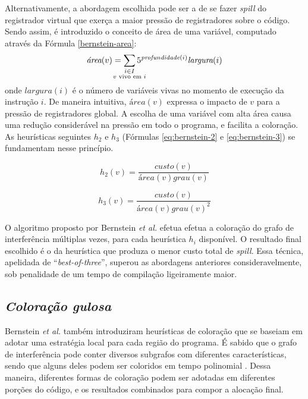 \documentclass[
	12pt,				%
	openright,			%
	oneside,			%
	a4paper,			%
	tccpreliminar,			%
	]{ABNT-DC-UEL}
\begin{document}
Alternativamente, a abordagem escolhida pode ser a de se fazer \textit{spill} do registrador virtual que exerça a maior pressão de registradores sobre o código. Sendo assim, é introduzido o conceito de área de uma variável, computado através da Fórmula \ref{bernstein-area}:
\begin{equation}
    \textit{área}(v) = \sum_{\mathclap{\substack{i \in I\\v\text{ vivo em }i}}} 5 ^ {\textit{profundidade}(i)} \textit{largura}(i)
    \label{bernstein-area}
\end{equation}
onde $\mathit{largura}(i)$ é o número de variáveis vivas no momento de execução da instrução $i$. De maneira intuitiva, $\mathit{área}(v)$ expressa o impacto de $v$ para a pressão de registradores global. A escolha de uma variável com alta área causa uma redução considerável na pressão em todo o programa, e facilita a coloração. As heurísticas seguintes $h_2$ e $h_3$ (Fórmulas \ref{eq:bernstein-2} e \ref{eq:bernstein-3}) se fundamentam nesse princípio.

\begin{equation}
    h_2(v) = \frac{\mathit{custo}(v)}
                  {\textit{área}(v)\mathit{grau}(v)}
    \label{eq:bernstein-2}
\end{equation}

\begin{equation}
    h_3(v) = \frac{\mathit{custo}(v)}
                  {\mathit{área}(v) \mathit{grau}(v) ^ 2}
    \label{eq:bernstein-3}
\end{equation}

O algoritmo proposto por Bernstein \textit{et al.} efetua efetua a coloração do grafo de interferência múltiplas vezes, para cada heurística $h_i$ disponível. O resultado final escolhido é o da heurística que produza o menor custo total de \textit{spill}. Essa técnica, apelidada de ``\textit{best-of-three}'', superou as abordagens anteriores consideravelmente, sob penalidade de um tempo de compilação ligeiramente maior.

\subsection{\textit{Coloração gulosa}}

Bernstein \textit{et al.} \cite{bernstein:89} também introduziram heurísticas de coloração que se baseiam em adotar uma estratégia local para cada região do programa. É sabido que o grafo de interferência pode conter diversos subgrafos com diferentes características, sendo que alguns deles podem ser coloridos em tempo polinomial \cite{golumbic:04, dagan:88}. Dessa maneira, diferentes formas de coloração podem ser adotadas em diferentes porções do código, e os resultados combinados para compor a alocação final.
\end{document}
